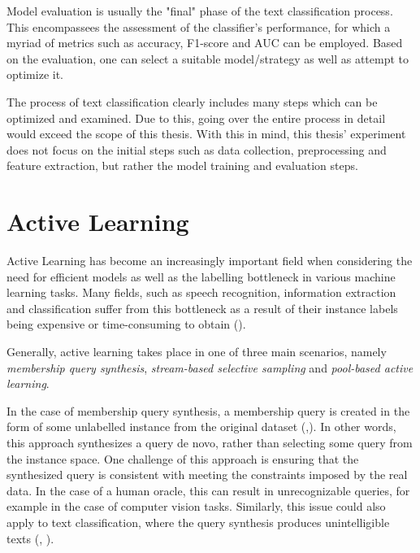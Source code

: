 \documentclass[english,bachelor,ul]{webisthesis} %
\begin{document}
Model evaluation is usually the "final" phase of the text classification process. This encompassees the assessment of the classifier's performance, for which a myriad of metrics such as accuracy, F1-score and AUC can be employed. Based on the evaluation, one can select a suitable model/strategy as well as attempt to optimize it.

The process of text classification clearly includes many steps which can be optimized and examined. Due to this, going over the entire process in detail would exceed the scope of this thesis. With this in mind, this thesis' experiment does not focus on the initial steps such as data collection, preprocessing and feature extraction, but rather the model training and evaluation steps.


\section{Active Learning}

Active Learning has become an increasingly important field when considering the need for efficient models as well as the labelling bottleneck in various machine learning tasks. Many fields, such as speech recognition, information extraction and classification suffer from this bottleneck as a result of their instance labels being expensive or time-consuming to obtain (\cite{settles.tr09}). 

Generally, active learning takes place in one of three main scenarios, namely \textit{membership query synthesis}, \textit{stream-based selective sampling} and \textit{pool-based active learning}. 

In the case of membership query synthesis, a membership query is created in the form of some unlabelled instance from the original dataset (\cite{DBLP:journals/ml/Angluin87},\cite{DBLP:journals/ijon/WangHYL15}). In other words, this approach synthesizes a query de novo, rather than selecting some query from the instance space. One challenge of this approach is ensuring that the synthesized query is consistent with meeting the constraints imposed by the real data. In the case of a human oracle, this can result in unrecognizable queries, for example in the case of computer vision tasks. Similarly, this issue could also apply to text classification, where the query synthesis produces unintelligible texts (\cite{langbaum92}, \cite{settles.tr09}).%
\end{document}
